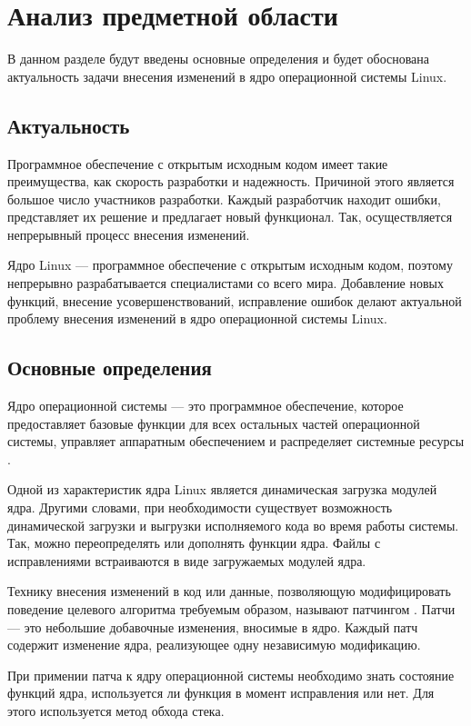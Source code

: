 \chapter{Анализ предметной области}

В данном разделе будут введены основные определения и будет обоснована актуальность задачи внесения изменений в ядро операционной системы Linux.

\section{Актуальность}

Программное обеспечение с открытым исходным кодом имеет такие преимущества, как скорость разработки и надежность. Причиной этого является большое число участников разработки. Каждый разработчик находит ошибки, представляет их решение и предлагает новый функционал. Так, осуществляется непрерывный процесс внесения изменений.

Ядро Linux --- программное обеспечение с открытым исходным кодом, поэтому непрерывно разрабатывается специалистами со всего мира. Добавление новых функций, внесение усовершенствований, исправление ошибок делают актуальной проблему внесения изменений в ядро операционной системы Linux.

\section{Основные определения}

Ядро операционной системы --- это программное обеспечение, которое предоставляет базовые функции для всех остальных частей операционной системы, управляет аппаратным обеспечением и распределяет системные ресурсы \cite{love}.

Одной из характеристик ядра Linux является динамическая загрузка модулей ядра. Другими словами, при необходимости существует возможность динамической загрузки и выгрузки исполняемого кода во время работы системы. Так, можно переопределять или дополнять функции ядра. Файлы с исправлениями встраиваются в виде загружаемых модулей ядра.

Технику внесения изменений в код или данные, позволяющую модифицировать поведение целевого алгоритма требуемым образом, называют патчингом \cite{patching}. Патчи --- это небольшие добавочные изменения, вносимые в ядро. Каждый патч содержит изменение ядра, реализующее одну независимую модификацию.

При примении патча к ядру операционной системы необходимо знать состояние функций ядра, используется ли функция в момент исправления или нет. Для этого используется метод обхода стека.

